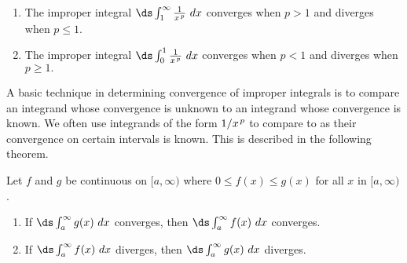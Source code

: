 \setboxwidth{80pt}
{\begin{enumerate}
\item		The improper integral $\ds \int_1^\infty\frac1{x\hskip1pt ^p}\ dx$ converges when $p>1$ and diverges when $p\leq 1.$
\item		The improper integral $\ds \int_0^1\frac1{x\hskip1pt ^p}\ dx$ converges when $p<1$ and diverges when $p\geq 1.$
\end{enumerate}}

A basic technique in determining convergence of improper integrals is to compare an integrand whose convergence is unknown to an integrand whose convergence is known. We often use integrands of the form $1/x\hskip1pt ^p$ to compare to as their convergence on certain intervals is known. This is described in the following theorem.


{%
Let $f$ and $g$ be continuous on $[a,\infty)$ where $0\leq f(x)\leq g(x)$ for all $x$ in $[a,\infty)$. 
	\begin{enumerate}
	\item		If $\ds \int_a^\infty g(x)\ dx$ converges, then $\ds \int_a^\infty f(x)\ dx$ converges.
	\item		If $\ds \int_a^\infty f(x)\ dx$ diverges, then $\ds \int_a^\infty g(x)\ dx$ diverges.
	\end{enumerate}

}

